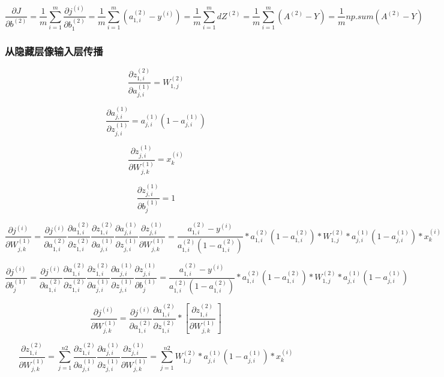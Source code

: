 \documentclass[
]{article}
\begin{document}
\[\frac{\partial J}{\partial b^{(2)}}=\frac{1}{m}\sum_{i=1}^{m}\frac{\partial{j^{(i)}}}{\partial{b^{(2)}_{1}}}=\frac{1}{m}\sum_{i=1}^{m}(a^{(2)}_{1,i}-y^{(i)})=\frac{1}{m}\sum_{i=1}^{m}dZ^{(2)}=\frac{1}{m}\sum_{i=1}^{m}(A^{(2)}-Y)=\frac{1}{m}np.sum(A^{(2)}-Y)\]

\hypertarget{header-n72}{%
\subsubsection{从隐藏层像输入层传播}\label{header-n72}}

\[\frac{\partial{z^{(2)}_{1,i}}}{\partial{a^{(1)}_{j,i}}} = W^{(2)}_{1,j}\]

\[\frac{\partial{a^{(1)}_{j,i}}}{\partial{z^{(1)}_{j,i}}} = {a^{(1)}_{j,i}}(1-{a^{(1)}_{j,i}})\]

\[\frac{\partial{z^{(1)}_{j,i}}}{\partial{W^{(1)}_{j,k}}} = x^{(i)}_{k}\]

\[\frac{\partial{z^{(1)}_{j,i}}}{\partial{b^{(1)}_{j}}} = 1\]

\[\frac{\partial{j^{(i)}}}{\partial{W^{(1)}_{j,k}}}=\frac{\partial{j^{(i)}}}{\partial{a^{(2)}_{1,i}}} \frac{\partial{a^{(2)}_{1,i}}}{\partial{z^{(2)}_{1,i}}} \frac{\partial{z^{(2)}_{1,i}}}{\partial{a^{(1)}_{j,i}}} \frac{\partial{a^{(1)}_{j,i}}}{\partial{z^{(1)}_{j,i}}} \frac{\partial{z^{(1)}_{j,i}}}{\partial{W^{(1)}_{j,k}}} = \frac{a^{(2)}_{1,i}-y^{(i)}}{a^{(2)}_{1,i}(1-a^{(2)}_{1,i})} * {a^{(2)}_{1,i}(1-a^{(2)}_{1,i})} * W^{(2)}_{1,j} * {a^{(1)}_{j,i}}(1-{a^{(1)}_{j,i}}) * x^{(i)}_{k}\]

\[\frac{\partial{j^{(i)}}}{\partial{b^{(1)}_{j}}}=\frac{\partial{j^{(i)}}}{\partial{a^{(2)}_{1,i}}} \frac{\partial{a^{(2)}_{1,i}}}{\partial{z^{(2)}_{1,i}}} \frac{\partial{z^{(2)}_{1,i}}}{\partial{a^{(1)}_{j,i}}} \frac{\partial{a^{(1)}_{j,i}}}{\partial{z^{(1)}_{j,i}}} \frac{\partial{z^{(1)}_{j,i}}}{\partial{b^{(1)}_{j}}} = \frac{a^{(2)}_{1,i}-y^{(i)}}{a^{(2)}_{1,i}(1-a^{(2)}_{1,i})} * {a^{(2)}_{1,i}(1-a^{(2)}_{1,i})} * W^{(2)}_{1,j} * {a^{(1)}_{j,i}}(1-{a^{(1)}_{j,i}})\]

\[\frac{\partial{j^{(i)}}}{\partial{W^{(1)}_{j,k}}}=\frac{\partial{j^{(i)}}}{\partial{a^{(2)}_{1,i}}} \frac{\partial{a^{(2)}_{1,i}}}{\partial{z^{(2)}_{1,i}}} * [\frac{\partial{z^{(2)}_{1,i}}}{\partial{W^{(1)}_{j,k}}}]\]

\[\frac{\partial{z^{(2)}_{1,i}}}{\partial{W^{(1)}_{j,k}}} = \sum_{j=1}^{n2}\frac{\partial{z^{(2)}_{1,i}}}{\partial{a^{(1)}_{j,i}}} \frac{\partial{a^{(1)}_{j,i}}}{\partial{z^{(1)}_{j,i}}} \frac{\partial{z^{(1)}_{j,i}}}{\partial{W^{(1)}_{j,k}}} = \sum_{j=1}^{n2}W^{(2)}_{1,j} * {a^{(1)}_{j,i}}(1-{a^{(1)}_{j,i}}) * x^{(i)}_{k}\]
\end{document}
